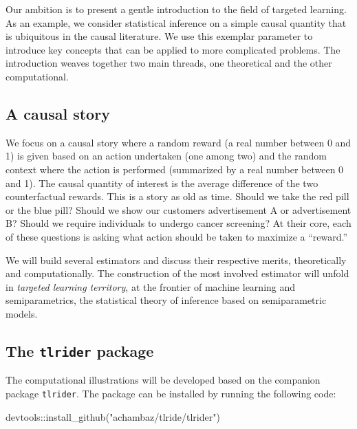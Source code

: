 \documentclass[
  11pt,
  openright,twoside]{book}
\newenvironment{Shaded}{\begin{snugshade}}{\end{snugshade}}
\newcommand{\FunctionTok}[1]{\textcolor[rgb]{0.00,0.00,0.00}{#1}}
\newcommand{\NormalTok}[1]{#1}
\newcommand{\SpecialCharTok}[1]{\textcolor[rgb]{0.00,0.00,0.00}{#1}}
\newcommand{\StringTok}[1]{\textcolor[rgb]{0.31,0.60,0.02}{#1}}
\theoremstyle{definition}
\theoremstyle{definition}
\theoremstyle{definition}
\theoremstyle{definition}
\theoremstyle{remark}
\begin{document}
Our ambition is to present a gentle introduction to the field of targeted
learning. As an example, we consider statistical inference on a simple causal
quantity that is ubiquitous in the causal literature. We use this exemplar
parameter to introduce key concepts that can be applied to more complicated
problems. The introduction weaves together two main threads, one theoretical
and the other computational.

\hypertarget{causal-story}{%
\subsection{A causal story}\label{causal-story}}

We focus on a causal story where a random reward (a real number between 0 and
1) is given based on an action undertaken (one among two) and the random
context where the action is performed (summarized by a real number between 0
and 1). The causal quantity of interest is the average difference of the two
counterfactual rewards. This is a story as old as time. Should we take the red
pill or the blue pill? Should we show our customers advertisement A or
advertisement B? Should we require individuals to undergo cancer screening? At
their core, each of these questions is asking what action should be taken to
maximize a ``reward.''

We will build several estimators and discuss their respective merits,
theoretically and computationally. The construction of the most involved
estimator will unfold in \emph{targeted learning territory}, at the frontier of
machine learning and semiparametrics, the statistical theory of inference
based on semiparametric models.

\hypertarget{tlrider-package}{%
\subsection{\texorpdfstring{The \texttt{tlrider} package}{The tlrider package}}\label{tlrider-package}}

The computational illustrations will be developed based on the companion
package \texttt{tlrider}. The package can be installed by
running the following code:

\begin{Shaded}
\begin{Highlighting}[]
\NormalTok{devtools}\SpecialCharTok{::}\FunctionTok{install\_github}\NormalTok{(}\StringTok{"achambaz/tlride/tlrider"}\NormalTok{)}
\end{Highlighting}
\end{Shaded}
\end{document}
